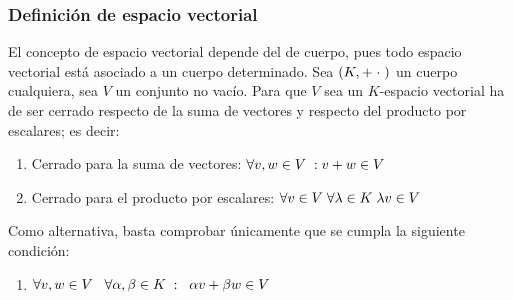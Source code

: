 \documentclass[12pt]{article}
\begin{document}
\subsubsection{Definición de espacio vectorial}
\hspace{3mm}
El concepto de espacio vectorial depende del de cuerpo, pues todo espacio vectorial
está asociado a un cuerpo determinado. Sea $(K, + \hspace{1mm}\cdot \hspace{1mm})$
un cuerpo cualquiera, sea $V$ un conjunto no vacío. Para que $V$ sea un $K$-espacio vectorial
ha de ser cerrado respecto de la suma de vectores y respecto del producto por escalares; es decir:
\begin{enumerate}[label=\roman*)]
    \item Cerrado para la suma de vectores: $\forall v, w \in V \hspace{1mm} : v + w \in V$
    \item Cerrado para el producto por escalares: $\forall v \in V \hspace{1mm} \forall \lambda \in K
      \hspace{1mm} \lambda v \in V$
\end{enumerate}
Como alternativa, basta comprobar únicamente que se cumpla la siguiente condición:
\begin{enumerate}[label=$\hat{\roman*)}$]
    \item $\forall v,w \in V \hspace{3mm}
        \forall \alpha, \beta \in K \hspace{1mm} :
        \hspace{2mm}\alpha v + \beta w \in V$
\end{enumerate}
\end{document}
